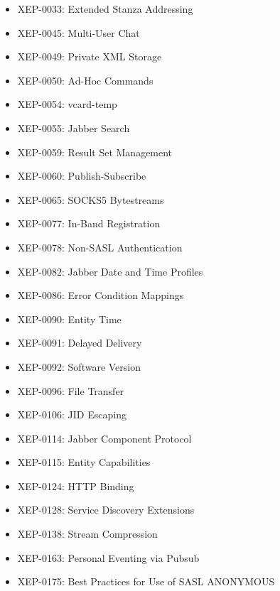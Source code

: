 \documentclass[letterpaper,10pt,english]{sphinxmanual}
\begin{document}
\begin{itemize}
\item {} 
XEP-0033: Extended Stanza Addressing

\item {} 
XEP-0045: Multi-User Chat

\item {} 
XEP-0049: Private XML Storage

\item {} 
XEP-0050: Ad-Hoc Commands

\item {} 
XEP-0054: vcard-temp

\item {} 
XEP-0055: Jabber Search

\item {} 
XEP-0059: Result Set Management

\item {} 
XEP-0060: Publish-Subscribe

\item {} 
XEP-0065: SOCKS5 Bytestreams

\item {} 
XEP-0077: In-Band Registration

\item {} 
XEP-0078: Non-SASL Authentication

\item {} 
XEP-0082: Jabber Date and Time Profiles

\item {} 
XEP-0086: Error Condition Mappings

\item {} 
XEP-0090: Entity Time

\item {} 
XEP-0091: Delayed Delivery

\item {} 
XEP-0092: Software Version

\item {} 
XEP-0096: File Transfer

\item {} 
XEP-0106: JID Escaping

\item {} 
XEP-0114: Jabber Component Protocol

\item {} 
XEP-0115: Entity Capabilities

\item {} 
XEP-0124: HTTP Binding

\item {} 
XEP-0128: Service Discovery Extensions

\item {} 
XEP-0138: Stream Compression

\item {} 
XEP-0163: Personal Eventing via Pubsub

\item {} 
XEP-0175: Best Practices for Use of SASL ANONYMOUS

\end{itemize}
\end{document}
